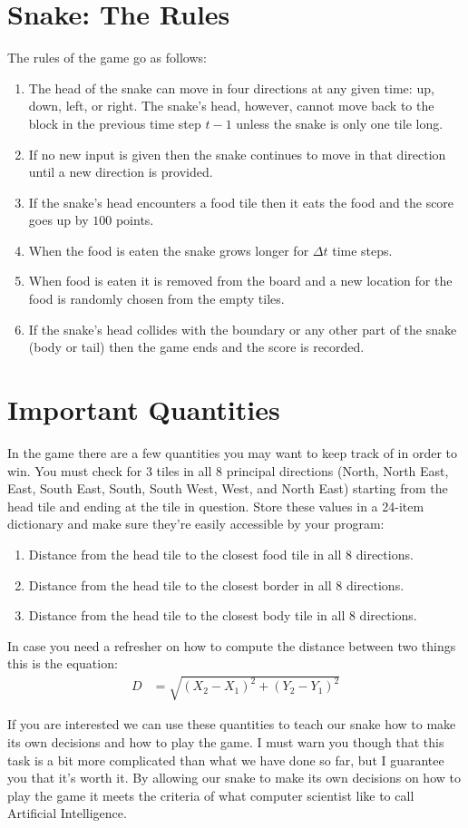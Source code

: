 \documentclass{article}
\begin{document}
\section{Snake: The Rules}
The rules of the game go as follows:
\begin{enumerate}
    \item The head of the snake can move in four directions at any given time: up, down, left, or right. The snake's head, however, cannot move back to the block in the previous time step $t-1$ unless the snake is only one tile long.
    \item If no new input is given then the snake continues to move in that direction until a new direction is provided.
    \item If the snake's head encounters a food tile then it eats the food and the score goes up by $100$ points.
    \item When the food is eaten the snake grows longer for $\Delta t$ time steps.
    \item When food is eaten it is removed from the board and a new location for the food is randomly chosen from the empty tiles.
    \item If the snake's head collides with the boundary or any other part of the snake (body or tail) then the game ends and the score is recorded.
\end{enumerate}
\section{Important Quantities}
In the game there are a few quantities you may want to keep track of in order to win. You must check for 3 tiles in all 8 principal directions (North, North East, East, South East, South, South West, West, and North East) starting from the head tile and ending at the tile in question. Store these values in a 24-item dictionary and make sure they're easily accessible by your program:
\begin{enumerate}
    \item Distance from the head tile to the closest food tile in all 8 directions.
    \item Distance from the head tile to the closest border in all 8 directions.
    \item Distance from the head tile to the closest body tile in all 8 directions.
\end{enumerate}

In case you need a refresher on how to compute the distance between two things this is the equation:
\begin{align}
    D &= \sqrt{(X_2 - X_1)^2 + (Y_2 - Y_1)^2}
\end{align}

If you are interested we can use these quantities to teach our snake how to make its own decisions and how to play the game. I must warn you though that this task is a bit more complicated than what we have done so far, but I guarantee you that it's worth it. By allowing our snake to make its own decisions on how to play the game it meets the criteria of what computer scientist like to call Artificial Intelligence.
\end{document}
